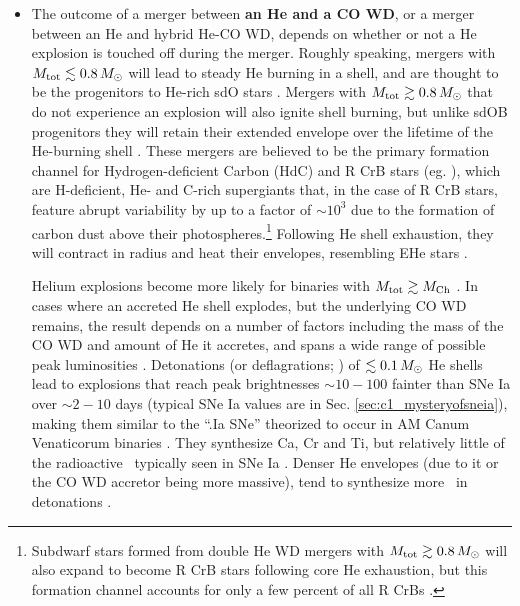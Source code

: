 \begin{itemize}
	\item The outcome of a merger between {\bf an He and a CO WD}, or a merger between an He and hybrid He-CO WD, depends on whether or not a He explosion is touched off during the merger.  Roughly speaking, mergers with $\Mtot \lesssim 0.8\,\Msun$ will lead to steady He burning in a shell, and are thought to be the progenitors to He-rich sdO stars \citep{justph11}.  Mergers with $\Mtot \gtrsim 0.8\,\Msun$ that do not experience an explosion will also ignite shell burning, but unlike sdOB progenitors they will retain their extended envelope over the lifetime of the He-burning shell \citep{ibent85, zhanj12b}.  These mergers are believed to be the primary formation channel for Hydrogen-deficient Carbon (HdC) and R CrB stars (eg. \citealt{webb84, ibent84, saioj02, clay12, zhan+14}), which are H-deficient, He- and C-rich supergiants that, in the case of R CrB stars, feature abrupt variability by up to a factor of $\sim10^3$ due to the formation of carbon dust above their photospheres.\footnote{Subdwarf stars formed from double He WD mergers with $\Mtot \gtrsim 0.8\,\Msun$ will also expand to become R CrB stars following core He exhaustion, but this formation channel accounts for only a few percent of all R CrBs \citep{zhanj12b}.}  Following He shell exhaustion, they will contract in radius and heat their envelopes, resembling EHe stars \cite{saioj02, jeff14}.

Helium explosions become more likely for binaries with $\Mtot\gtrsim\Mch$ \citep{dan+12, dan+14}.  In cases where an accreted He shell explodes, but the underlying CO WD remains, the result depends on a number of factors including the mass of the CO WD and amount of He it accretes, and spans a wide range of possible peak luminosities \citep{woosk11}.  Detonations (or deflagrations; \citealt{woosk11}) of $\lesssim0.1\,\Msun$ He shells lead to explosions that reach peak brightnesses $\sim10-100$ fainter than SNe Ia over $\sim2-10$ days (typical SNe Ia values are in Sec. \ref{sec:c1_mysteryofsneia}), making them similar to the ``.Ia SNe'' theorized to occur in AM Canum Venaticorum binaries \citep{bild+07}.  They synthesize Ca, Cr and Ti, but relatively little of the radioactive \Ni\ typically seen in SNe Ia \citep{shen+10he, woosk11, wald+11}.  Denser He envelopes (due to it or the CO WD accretor being more massive), tend to synthesize more \Ni\ in detonations \citep{shen+10he, wald+11}. 



\end{itemize}

